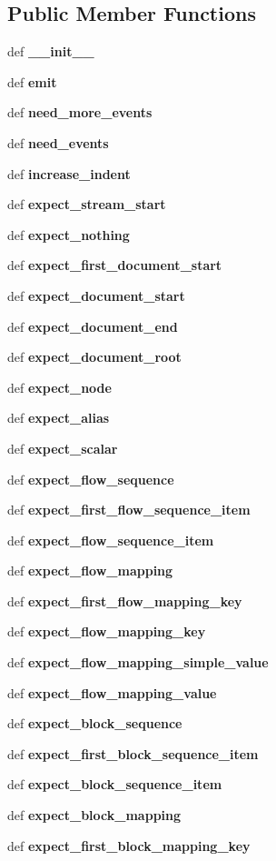 \subsection*{Public Member Functions}
\begin{CompactItemize}
\item 
def {\bf \_\-\_\-init\_\-\_\-}
\item 
def {\bf emit}
\item 
def {\bf need\_\-more\_\-events}
\item 
def {\bf need\_\-events}
\item 
def {\bf increase\_\-indent}
\item 
def {\bf expect\_\-stream\_\-start}
\item 
def {\bf expect\_\-nothing}
\item 
def {\bf expect\_\-first\_\-document\_\-start}
\item 
def {\bf expect\_\-document\_\-start}
\item 
def {\bf expect\_\-document\_\-end}
\item 
def {\bf expect\_\-document\_\-root}
\item 
def {\bf expect\_\-node}
\item 
def {\bf expect\_\-alias}
\item 
def {\bf expect\_\-scalar}
\item 
def {\bf expect\_\-flow\_\-sequence}
\item 
def {\bf expect\_\-first\_\-flow\_\-sequence\_\-item}
\item 
def {\bf expect\_\-flow\_\-sequence\_\-item}
\item 
def {\bf expect\_\-flow\_\-mapping}
\item 
def {\bf expect\_\-first\_\-flow\_\-mapping\_\-key}
\item 
def {\bf expect\_\-flow\_\-mapping\_\-key}
\item 
def {\bf expect\_\-flow\_\-mapping\_\-simple\_\-value}
\item 
def {\bf expect\_\-flow\_\-mapping\_\-value}
\item 
def {\bf expect\_\-block\_\-sequence}
\item 
def {\bf expect\_\-first\_\-block\_\-sequence\_\-item}
\item 
def {\bf expect\_\-block\_\-sequence\_\-item}
\item 
def {\bf expect\_\-block\_\-mapping}
\item 
def {\bf expect\_\-first\_\-block\_\-mapping\_\-key}
\item 

\end{CompactItemize}

